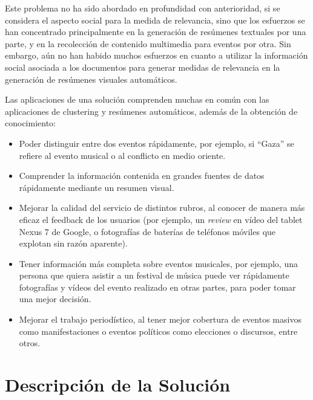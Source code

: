 \documentclass[upright, contnum]{umemoria}
\begin{document}
  Este problema no ha sido abordado en profundidad con anterioridad,
  si se considera el aspecto social para la medida de relevancia,
  sino que los esfuerzos se han concentrado principalmente en la
  generación de resúmenes textuales por una parte\cite{Conrad:2005:EDC:1165485.1165513,allan2002topic,DBLP:conf:spire:Bravo-MarquezM12,Diakopoulos:2012:FAS:2208276.2208409},
  y en la recolección de contenido multimedia para eventos por
  otra\cite{Becker:2012:ICP:2124295.2124360,Liu:2011:USM:2072609.2072613,Becker:2010:LSM:1718487.1718524}. Sin embargo, aún no
  han habido muchos esfuerzos en cuanto a utilizar la información
  social asociada a los documentos para generar medidas de relevancia
  en la generación de resúmenes visuales automáticos.

  Las aplicaciones de una solución comprenden muchas en común con las
  aplicaciones de clustering y resúmenes automáticos, además de la
  obtención de conocimiento:

\begin{itemize}
\item Poder distinguir entre dos eventos rápidamente, por ejemplo, si
    ``Gaza'' se refiere al evento musical o al conflicto en medio
    oriente.
\item Comprender la información contenida en grandes fuentes de datos
    rápidamente mediante un resumen visual.
\item Mejorar la calidad del servicio de distintos rubros, al conocer de
    manera más eficaz el feedback de los usuarios (por ejemplo, un
    \emph{review} en vídeo del tablet Nexus 7 de Google, o fotografías de
    baterías de teléfonos móviles que explotan sin razón aparente).
\item Tener información más completa sobre eventos musicales, por
    ejemplo, una persona que quiera asistir a un festival de música
    puede ver rápidamente fotografías y vídeos del evento realizado en
    otras partes, para poder tomar una mejor decisión.
\item Mejorar el trabajo periodístico, al tener mejor cobertura de
    eventos masivos como manifestaciones o eventos políticos como
    elecciones o discursos, entre otros.
\end{itemize}
  


\chapter{Descripción de la Solución}
\label{sec-4}
\end{document}
